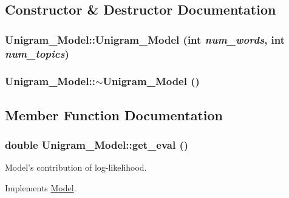 \subsection{Constructor \& Destructor Documentation}
\hypertarget{class_unigram___model_aa86fe0d209d879da85845ac965b81114}{
\subsubsection[{Unigram\_\-Model}]{\setlength{\rightskip}{0pt plus 5cm}Unigram\_\-Model::Unigram\_\-Model (int {\em num\_\-words}, \/  int {\em num\_\-topics})}}
\label{class_unigram___model_aa86fe0d209d879da85845ac965b81114}
\hypertarget{class_unigram___model_ad586c2960ea07499611ca3c35050d8d3}{
\subsubsection[{$\sim$Unigram\_\-Model}]{\setlength{\rightskip}{0pt plus 5cm}Unigram\_\-Model::$\sim$Unigram\_\-Model ()}}
\label{class_unigram___model_ad586c2960ea07499611ca3c35050d8d3}


\subsection{Member Function Documentation}
\hypertarget{class_unigram___model_a68837b7da897fc7ce834df31d6930281}{
\subsubsection[{get\_\-eval}]{\setlength{\rightskip}{0pt plus 5cm}double Unigram\_\-Model::get\_\-eval ()}}
\label{class_unigram___model_a68837b7da897fc7ce834df31d6930281}


Model's contribution of log-\/likelihood. 



Implements \hyperlink{class_model_a36d3376040155630afbfcbdc3160c839}{Model}.

